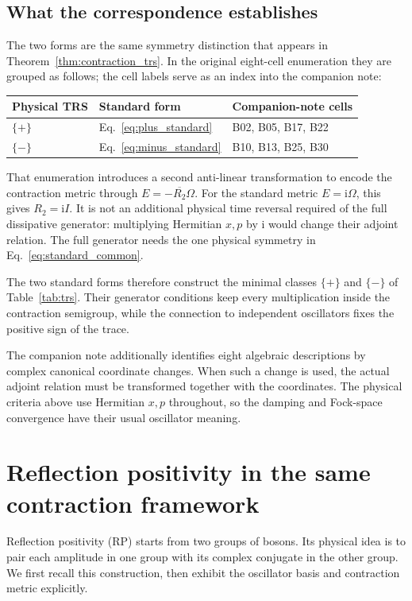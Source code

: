 \documentclass[11pt,a4paper]{article}
\newcommand{\ii}{\mathrm i}
\numberwithin{equation}{section}
\begin{document}
\subsection{What the correspondence establishes}

The two forms are the same symmetry distinction that appears in
Theorem~\ref{thm:contraction_trs}. In the original eight-cell enumeration they are
grouped as follows; the cell labels serve as an index into the companion
note:
\begin{center}
\begin{tabular}{lll}
\toprule
Physical TRS & Standard form & Companion-note cells\\
\midrule
$\{+\}$ & Eq.~\eqref{eq:plus_standard} & B02, B05, B17, B22\\
$\{-\}$ & Eq.~\eqref{eq:minus_standard} & B10, B13, B25, B30\\
\bottomrule
\end{tabular}
\end{center}
That enumeration introduces a second anti-linear transformation to encode
the contraction metric through $E=-\overline{R_2}\Omega$.
For the standard metric $E=\ii\Omega$, this gives $R_2=\ii I$.
It is not an additional physical time reversal required of the full
dissipative generator: multiplying Hermitian $x,p$ by $\ii$ would change
their adjoint relation. The full generator needs the one physical symmetry
in Eq.~\eqref{eq:standard_common}.

The two standard forms therefore construct the minimal classes
$\{+\}$ and $\{-\}$ of Table~\ref{tab:trs}. Their generator conditions
keep every multiplication inside the contraction semigroup, while the
connection to independent oscillators fixes the positive sign of the trace.

The companion note additionally identifies eight algebraic descriptions by
complex canonical coordinate changes. When such a change is used, the actual
adjoint relation must be transformed together with the coordinates. The
physical criteria above use Hermitian $x,p$ throughout, so the damping and
Fock-space convergence have their usual oscillator meaning.

\section{Reflection positivity in the same contraction framework}
\label{sec:rp}

Reflection positivity (RP) starts from two groups of bosons. Its physical
idea is to pair each amplitude in one group with its complex conjugate
in the other group. We first recall this construction, then exhibit the
oscillator basis and contraction metric explicitly.
\end{document}
